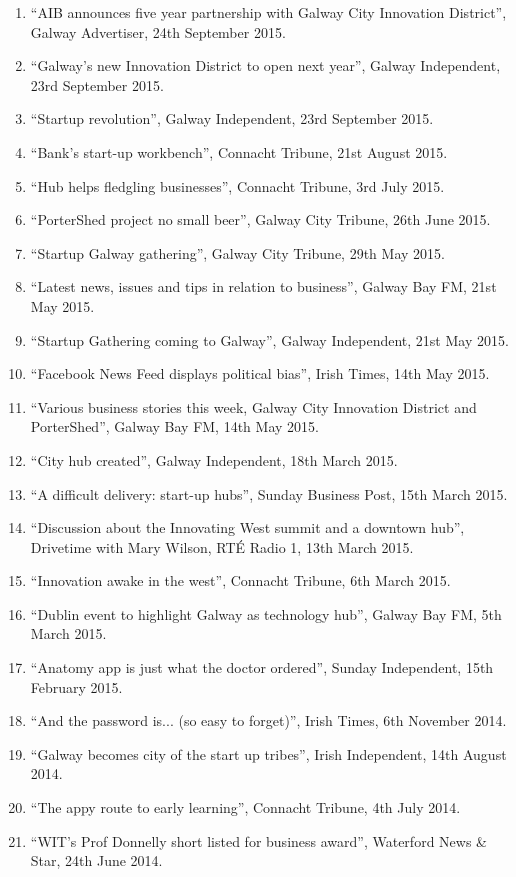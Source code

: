 \documentclass[10pt,a4paper]{res} %
\begin{document}
\begin{resume}
{\begin{enumerate}
\item ``AIB announces five year partnership with Galway City Innovation District'', Galway Advertiser, 24th September 2015.
\item ``Galway's new Innovation District to open next year'', Galway Independent, 23rd September 2015.
\item ``Startup revolution'', Galway Independent, 23rd September 2015.
\item ``Bank's start-up workbench'', Connacht Tribune, 21st August 2015.
\item ``Hub helps fledgling businesses'', Connacht Tribune, 3rd July 2015.
\item ``PorterShed project no small beer'', Galway City Tribune, 26th June 2015.
\item ``Startup Galway gathering'', Galway City Tribune, 29th May 2015.
\item ``Latest news, issues and tips in relation to business'', Galway Bay FM, 21st May 2015.
\item ``Startup Gathering coming to Galway'', Galway Independent, 21st May 2015.
\item ``Facebook News Feed displays political bias'', Irish Times, 14th May 2015.
\item ``Various business stories this week, Galway City Innovation District and PorterShed'', Galway Bay FM, 14th May 2015.
\item ``City hub created'', Galway Independent, 18th March 2015.
\item ``A difficult delivery: start-up hubs'', Sunday Business Post, 15th March 2015.
\item ``Discussion about the Innovating West summit and a downtown hub'', Drivetime with Mary Wilson, RT\'{E} Radio 1, 13th March 2015.
\item ``Innovation awake in the west'', Connacht Tribune, 6th March 2015.
\item ``Dublin event to highlight Galway as technology hub'', Galway Bay FM, 5th March 2015.
\item ``Anatomy app is just what the doctor ordered'', Sunday Independent, 15th February 2015.
\item ``And the password is... (so easy to forget)'', Irish Times, 6th November 2014.
\item ``Galway becomes city of the start up tribes'', Irish Independent, 14th August 2014.
\item ``The appy route to early learning'', Connacht Tribune, 4th July 2014.
\item ``WIT's Prof Donnelly short listed for business award'', Waterford News \& Star, 24th June 2014.

\end{enumerate}}
\end{resume}
\end{document}
